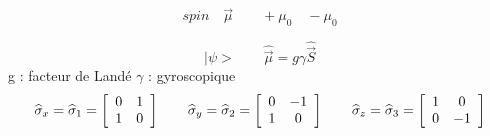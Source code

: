 \[
spin\quad\vec\mu\qquad+\mu_0\quad-\mu_0
\]

\[
|\psi>\qquad\widehat{\vec\mu} = g\gamma\widehat{\vec S}
\]
g : facteur de Landé \qquad  $\gamma$ : gyroscopique
\[
\widehat\sigma_x = \widehat\sigma_1 = \left[
\begin{array}{ c c }
 0 & 1 \\ 1 & 0 \\
\end{array}\right]\qquad
\widehat\sigma_y = \widehat\sigma_2 = \left[
\begin{array}{ c c }
 0 & -1 \\ 1 & 0 \\
\end{array}\right]\qquad
\widehat\sigma_z = \widehat\sigma_3 = \left[
\begin{array}{ c c }
 1 & 0 \\ 0 & -1 \\
\end{array}\right]
\]
\[
\]
\[
\]
\[
\]
